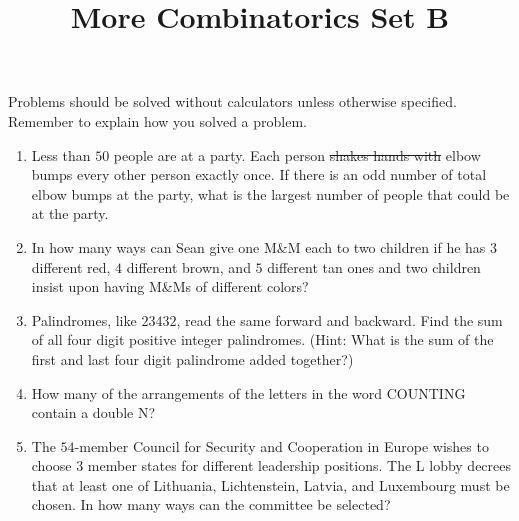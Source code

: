 \documentclass{article}
\title{More Combinatorics Set B}
\author{}
\date{}
\begin{document}
\maketitle
\noindent Problems should be solved without calculators unless otherwise 
specified. Remember to explain how you solved a problem.
\begin{enumerate}
    \item Less than $50$ people are at a party. Each person \sout{shakes hands 
        with} elbow bumps every other person exactly once. If there is an odd 
        number of total elbow bumps at the party, what is the largest number of 
        people that could be at the party.
        \vspace{3cm}
    \item In how many ways can Sean give one M\&M each to two children if he has 
        $3$ different red, $4$ different brown, and $5$ different tan ones and 
        two children insist upon having M\&Ms of different colors?
        \vspace{3cm}
    \item Palindromes, like $23432$, read the same forward and backward. Find 
        the sum of all four digit positive integer palindromes. (Hint: What is 
        the sum of the first and last four digit palindrome added together?)
        \vspace{3cm}
    \item How many of the arrangements of the letters in the word COUNTING 
        contain a double N?
        \vspace{3cm}
    \item The $54$-member Council for Security and Cooperation in Europe wishes 
        to choose $3$ member states for different leadership positions. The L 
        lobby decrees that at least one of Lithuania, Lichtenstein, Latvia, and 
        Luxembourg must be chosen. In how many ways can the committee be 
        selected?
        \vspace{3cm}
\end{enumerate}
\end{document}
